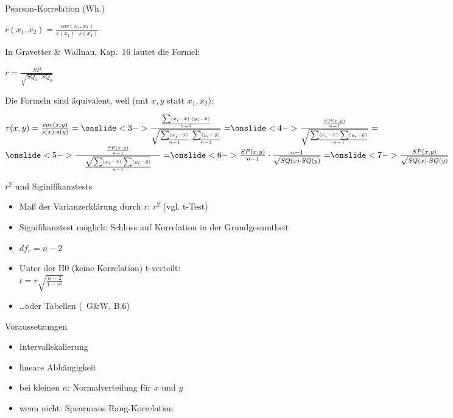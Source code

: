 \begin{frame}
  {Pearson-Korrelation (Wh.)}
  \begin{center}
    \alert{$r(x_1,x_2)=\frac{cov(x_1,x_2)}{s(x_1)\cdot s(x_2)}$}
  \end{center}
  \pause
  In Gravetter \& Wallnau, Kap.\ 16 lautet die Formel:
  \begin{center}
    \alert{$r=\frac{SP}{\sqrt{SQ_x\cdot SQ_y}}$}
  \end{center}
  Die Formeln sind äquivalent, weil (mit $x,y$ statt $x_1,x_2$):
  \begin{center}
    $r(x,y)=\frac{cov(x,y)}{s(x)\cdot s(y)}=\onslide<3->{\frac{\frac{\sum(x_i-\bar{x})\cdot(y_i-\bar{x})}{n-1}}{\sqrt{\frac{\sum(x_i-\bar{x})}{n-1}\cdot\frac{\sum(y_i-\bar{y})}{n-1}}}=}\onslide<4->{\frac{\frac{SP(x,y)}{n-1}}{\sqrt{\frac{\sum(x_i-\bar{x})\cdot\sum(y_i-\bar{y})}{n-1}}}=}$\\[3ex]
    $\onslide<5->{\frac{\frac{SP(x,y)}{n-1}}{\ \ \ \frac{\sqrt{\sum(x_i-\bar{x})\cdot\sum(y_i-\bar{y})}}{n-1}\ \ \ }=}\onslide<6->{\frac{SP(x,y)}{n-1}\cdot\frac{n-1}{\sqrt{SQ(x)\cdot SQ(y)}}=}\onslide<7->{\frac{SP(x,y)}{\sqrt{SQ(x)\cdot SQ(y)}}}$
  \end{center}
\end{frame}

\begin{frame}
  {$r^2$ und Siginifikanztests}
  \begin{itemize}[<+->]
    \item Maß der Varianzerklärung durch $r$: \alert{$r^2$} (vgl. t-Test)
    \item \alert{Signifikanztest} möglich: Schluss auf Korrelation in der Grundgesamtheit
    \item $df_r=n-2$
    \item Unter der H0 (keine Korrelation) t-verteilt:\\
      \alert{$t=r\sqrt{\frac{n-2}{1-r^2}}$}
    \item \dots oder Tabellen (\zB\ G\&W, B.6)
  \end{itemize}
\end{frame}

\begin{frame}
  {Voraussetzungen}
  \begin{itemize}[<+->]
    \item \alert{Intervallskalierung}
    \item \alert{lineare} Abhängigkeit
    \item bei kleinen $n$: \alert{Normalverteilung} für $x$ und $y$
      \vspace{1cm}
    \item wenn nicht: \alert{Spearmans Rang-Korrelation}
  \end{itemize}
\end{frame}


